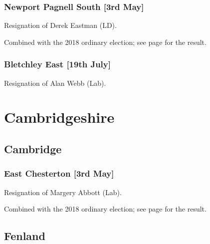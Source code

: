 \documentclass[a4paper,openany]{book}
\begin{document}
\begin{resultsiii}
\subsubsection*{Newport Pagnell South \hspace*{\fill}\nolinebreak[1]%
\enspace\hspace*{\fill}
[3rd May]}


Resignation of Derek Eastman (LD).

Combined with the 2018 ordinary election; see page \pageref{NewportPagnellSouthMiltonKeynes} for the result.

\subsubsection*{Bletchley East \hspace*{\fill}\nolinebreak[1]%
\enspace\hspace*{\fill}
[19th July]}


Resignation of Alan Webb (Lab).

\section{Cambridgeshire}

\subsection*{Cambridge}

\subsubsection*{East Chesterton \hspace*{\fill}\nolinebreak[1]%
\enspace\hspace*{\fill}
[3rd May]}


Resignation of Margery Abbott (Lab).

Combined with the 2018 ordinary election; see page \pageref{EastChestertonCambridge} for the result.

\subsection*{Fenland}


\end{resultsiii}
\end{document}
